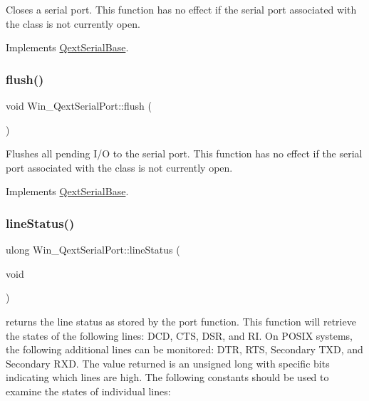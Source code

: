 Closes a serial port. This function has no effect if the serial port associated with the class is not currently open. 

Implements \mbox{\hyperlink{class_qext_serial_base}{Qext\+Serial\+Base}}.

\mbox{\label{class_win___qext_serial_port_ac72e737e24bda9c14a9388eac8ef2622}} 
\subsubsection{\texorpdfstring{flush()}{flush()}}
{\footnotesize\ttfamily void Win\+\_\+\+Qext\+Serial\+Port\+::flush (\begin{DoxyParamCaption}{ }\end{DoxyParamCaption})\hspace{0.3cm}{\ttfamily [virtual]}}

Flushes all pending I/O to the serial port. This function has no effect if the serial port associated with the class is not currently open. 

Implements \mbox{\hyperlink{class_qext_serial_base}{Qext\+Serial\+Base}}.

\mbox{\label{class_win___qext_serial_port_a5aecf6de25391bb59ad4d18f3562eef3}} 
\subsubsection{\texorpdfstring{line\+Status()}{lineStatus()}}
{\footnotesize\ttfamily ulong Win\+\_\+\+Qext\+Serial\+Port\+::line\+Status (\begin{DoxyParamCaption}\item[{void}]{ }\end{DoxyParamCaption})\hspace{0.3cm}{\ttfamily [virtual]}}

returns the line status as stored by the port function. This function will retrieve the states of the following lines\+: D\+CD, C\+TS, D\+SR, and RI. On P\+O\+S\+IX systems, the following additional lines can be monitored\+: D\+TR, R\+TS, Secondary T\+XD, and Secondary R\+XD. The value returned is an unsigned long with specific bits indicating which lines are high. The following constants should be used to examine the states of individual lines\+:

